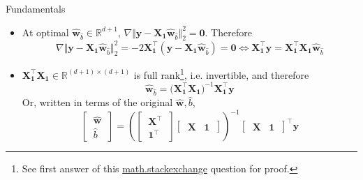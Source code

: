 \documentclass{beamer}
\numberwithin{equation}{section}
\newcommand{\ahref}[2]{\href{#1}{\alert{#2}}}
\begin{document}
\begin{frame}{Fundamentals}
    \begin{itemize}
        \item
        At optimal $ \hat{\mathbf{w}}_{\hat{b}} \in \mathbb{R}^{d + 1} $,
        $ \nabla \Vert\mathbf{y} - \mathbf{X}_\mathbf{1}
        \hat{\mathbf{w}}_{\hat{b}}\Vert_2^2 = \mathbf{0} $. Therefore
        \begin{equation*}
            \nabla\Vert\mathbf{y} -
            \mathbf{X}_\mathbf{1}\hat{\mathbf{w}}_{\hat{b}}\Vert_2^2 =
            -2\mathbf{X}_\mathbf{1}^\top(\mathbf{y} -
            \mathbf{X}_\mathbf{1}\hat{\mathbf{w}}_{\hat{b}}) = \mathbf{0}
            \Leftrightarrow \mathbf{X}_\mathbf{1}^\top\mathbf{y} =
            \mathbf{X}_\mathbf{1}^\top\mathbf{X}_\mathbf{1}
            \hat{\mathbf{w}}_{\hat{b}}
        \end{equation*}

        \item
        $ \mathbf{X}_\mathbf{1}^\top\mathbf{X}_\mathbf{1} \in
        \mathbb{R}^{(d + 1) \times (d + 1)} $ is full rank\footnote{
            See first answer of this \ahref{
https://math.stackexchange.com/questions/349738/prove-operatornamerankata-operatornameranka-for-any-a-in-m-m-times-n}
            {math.stackexchange} question for proof.
        }, i.e. invertible,
        and therefore
        \begin{equation} \label{lr_ols_aug}
            \hat{\mathbf{w}}_{\hat{b}} = \big(
                \mathbf{X}_\mathbf{1}^\top\mathbf{X}_\mathbf{1}
            \big)^{-1}\mathbf{X}_\mathbf{1}^\top\mathbf{y}
        \end{equation}
        Or, written in terms of the original $ \hat{\mathbf{w}}, \hat{b} $,
        \begin{equation} \label{lr_ols_block}
            \begin{bmatrix}
                \ \hat{\mathbf{w}} \ \\ \ \hat{b} \
            \end{bmatrix} =
            \left(
                \begin{bmatrix}
                    \ \mathbf{X}^\top \ \\ \ \mathbf{1}^\top \
                \end{bmatrix}
                \begin{bmatrix}
                    \ \mathbf{X} & \mathbf{1} \
                \end{bmatrix}
            \right)^{-1}
            \begin{bmatrix}
                \ \mathbf{X} & \mathbf{1} \
            \end{bmatrix}^\top\mathbf{y}
        \end{equation}
    \end{itemize}
\end{frame}
\end{document}
